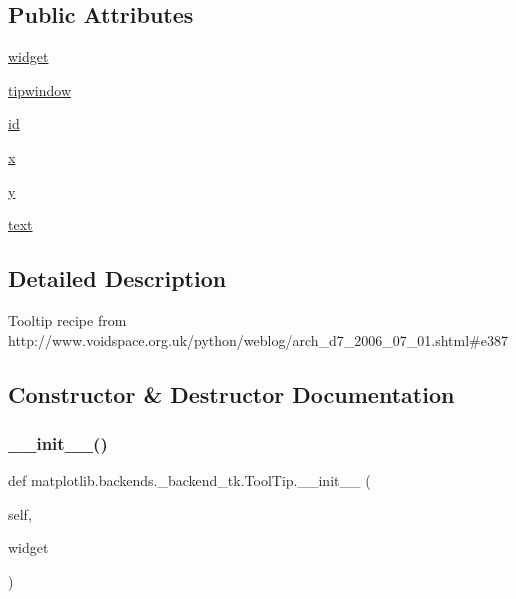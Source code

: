 \subsection*{Public Attributes}
\begin{DoxyCompactItemize}
\item 
\hyperlink{classmatplotlib_1_1backends_1_1__backend__tk_1_1ToolTip_a48ef037eca560b5c9ea6b6bcfcdb795c}{widget}
\item 
\hyperlink{classmatplotlib_1_1backends_1_1__backend__tk_1_1ToolTip_a42b174d112bce6ba6fe4ae0b3bc2501b}{tipwindow}
\item 
\hyperlink{classmatplotlib_1_1backends_1_1__backend__tk_1_1ToolTip_a3f5381629ac9a924bc35e7f8c5054258}{id}
\item 
\hyperlink{classmatplotlib_1_1backends_1_1__backend__tk_1_1ToolTip_a0e316a13b475b946271a7db9debb2d2b}{x}
\item 
\hyperlink{classmatplotlib_1_1backends_1_1__backend__tk_1_1ToolTip_ad75693e51b8f50c689f9f1abc5378ebe}{y}
\item 
\hyperlink{classmatplotlib_1_1backends_1_1__backend__tk_1_1ToolTip_aeaeb231e46550c97265e41ce9b40e004}{text}
\end{DoxyCompactItemize}


\subsection{Detailed Description}
\begin{DoxyVerb}Tooltip recipe from
http://www.voidspace.org.uk/python/weblog/arch_d7_2006_07_01.shtml#e387
\end{DoxyVerb}
 

\subsection{Constructor \& Destructor Documentation}
\mbox{\label{classmatplotlib_1_1backends_1_1__backend__tk_1_1ToolTip_a9e9575eb5d34e3d023e74c30e80dc00a}} 
\subsubsection{\texorpdfstring{\+\_\+\+\_\+init\+\_\+\+\_\+()}{\_\_init\_\_()}}
{\footnotesize\ttfamily def matplotlib.\+backends.\+\_\+backend\+\_\+tk.\+Tool\+Tip.\+\_\+\+\_\+init\+\_\+\+\_\+ (\begin{DoxyParamCaption}\item[{}]{self,  }\item[{}]{widget }\end{DoxyParamCaption})}



